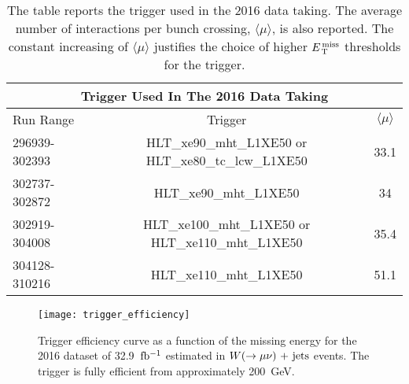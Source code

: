 \begin{table}[!hb]
  \centering
  \begin{tabular}{lcc}
    \toprule
    \multicolumn{3}{c}{Trigger Used In The 2016 Data Taking} \\
    \midrule \midrule
    Run Range & Trigger & $\langle \mu \rangle$ \\
    \midrule
    296939-302393 & HLT\_xe90\_mht\_L1XE50 or HLT\_xe80\_tc\_lcw\_L1XE50 & 33.1 \\
    302737-302872 & HLT\_xe90\_mht\_L1XE50 & 34 \\
    302919-304008 & HLT\_xe100\_mht\_L1XE50 or HLT\_xe110\_mht\_L1XE50 & 35.4 \\
    304128-310216 & HLT\_xe110\_mht\_L1XE50 & 51.1 \\
    \bottomrule
  \end{tabular}
  \caption{The table reports the trigger used in the 2016 data taking. The
    average number of interactions per bunch crossing, $\langle \mu \rangle$, is
  also reported. The constant increasing of $\langle \mu \rangle$ justifies the
  choice of higher $E_\mathrm{\, T}^\mathrm{\, miss}$ thresholds for the trigger.}
  \label{tab:trigger_periods}
\end{table}
\begin{figure}[!ht]
  \centering
    \texttt{[image: trigger\_efficiency]}
    \caption{Trigger efficiency curve as a function of the missing energy for
      the 2016 dataset of 32.9~$\mbox{fb$^{-1}$}$ estimated in $W (\rightarrow \mu \nu)\mathrm{~+~jets}$ events. The
      trigger is fully efficient from approximately 200~GeV.}
    \label{fig:trigger_efficiency}
\end{figure}
